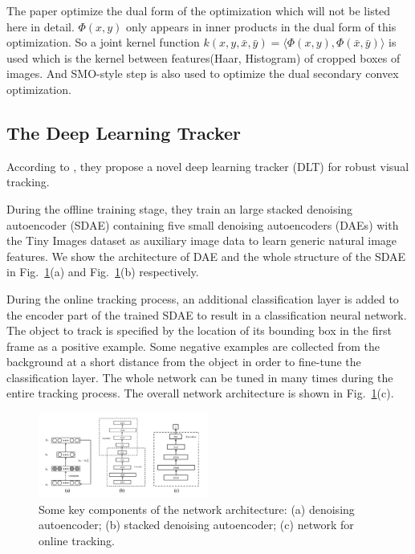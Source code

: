 \documentclass{acm_proc_article-sp}
\begin{document}
The paper optimize the dual form of the optimization which will not be listed here in detail. $\Phi(x,y)$ only appears in inner products in the dual form of this optimization. So a joint kernel function $k(x,y,\bar{x},\bar{y}) = \langle \Phi(x,y), \Phi(\bar{x},\bar{y})\rangle$ is used which is the kernel between features(Haar, Histogram) of cropped boxes of images. And SMO-style step is also used to optimize the dual secondary convex optimization.

\subsection{The Deep Learning Tracker}
According to \cite{dlt}, they propose a novel deep learning tracker (DLT) for robust visual tracking.

During the offline training stage, they train an large stacked denoising autoencoder (SDAE) containing five small denoising autoencoders (DAEs) with the Tiny Images dataset \cite{tiny} as auxiliary image data to learn generic natural image features.
We show the architecture of DAE and the whole structure of the SDAE in Fig.~\ref{fig:dlt}(a) and Fig.~\ref{fig:dlt}(b) respectively.

During the online tracking process, an additional classification layer is added to the encoder part of the trained SDAE to result in a classification neural network.
The object to track is specified by the location of its bounding box in the first frame as a positive example.
Some negative examples are collected from the background at a short distance from the object in order to fine-tune the classification layer.
The whole network can be tuned in many times during the entire tracking process.
The overall network architecture is shown in Fig.~\ref{fig:dlt}(c).

\begin{center}
    \begin{figure}[hbt]
      \includegraphics[width=0.5\textwidth]{dlt.png}
      \caption{Some key components of the network architecture: (a) denoising autoencoder; (b) stacked denoising autoencoder; (c) network for online tracking.}
      \label{fig:dlt}
    \end{figure}
\end{center}
\end{document}
